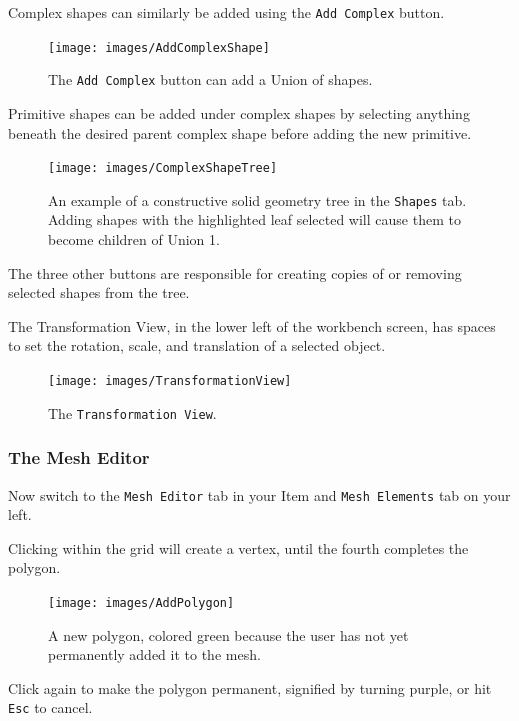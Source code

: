 Complex shapes can similarly be added using the \texttt{Add Complex} button.

\begin{figure}[!h]
\texttt{[image: images/AddComplexShape]}
\centering
\caption{The \texttt{Add Complex} button can add a Union of shapes.}
\label{fig:addcomplexshape}
\end{figure}

Primitive shapes can be added under complex shapes by selecting anything beneath
the desired parent complex shape before adding the new primitive.

\begin{figure}[!h]
\texttt{[image: images/ComplexShapeTree]}
\centering
\caption{An example of a constructive solid geometry tree in the
\texttt{Shapes} tab. Adding shapes with the highlighted leaf selected will
cause them to become children of Union 1.}
\label{fig:complexshapetree}
\end{figure}

The three other buttons are responsible for creating copies of or removing
selected shapes from the tree. 

The Transformation View, in the lower left of the workbench screen, has spaces
to set the rotation, scale, and translation of a selected object.

\begin{figure}[!h]
\texttt{[image: images/TransformationView]}
\centering
\caption{The \texttt{Transformation View}.}
\label{fig:transformationview}
\end{figure}

\subsubsection{The Mesh Editor}

Now switch to the \texttt{Mesh Editor} tab in your Item and \texttt{Mesh
Elements} tab on your left.

Clicking within the grid will create a vertex, until the fourth completes the
polygon.

\begin{figure}[!h]
\texttt{[image: images/AddPolygon]}
\centering
\caption{A new polygon, colored green because the user has not yet permanently
added it to the mesh.}
\label{fig:addpolygon}
\end{figure}

Click again to make the polygon permanent, signified by turning purple, or hit
\texttt{Esc} to cancel.

